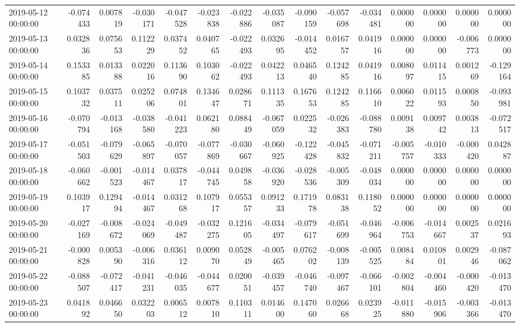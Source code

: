 \begin{tabular}{lrrrrrrrrrrrrrr}
2019-05-12 00:00:00 & -0.074433 & 0.007819 & -0.030171 & -0.047528 & -0.023838 & -0.022886 & -0.035087 & -0.090159 & -0.057698 & -0.034481 & 0.000000 & 0.000000 & 0.000000 & 0.000000 \\
2019-05-13 00:00:00 & 0.032836 & 0.075653 & 0.112229 & 0.037452 & 0.040765 & -0.022493 & 0.032695 & -0.014452 & 0.016757 & 0.041916 & 0.000000 & 0.000000 & -0.006773 & 0.000000 \\
2019-05-14 00:00:00 & 0.153385 & 0.013388 & 0.022016 & 0.113690 & 0.103062 & -0.022493 & 0.042213 & 0.046540 & 0.124285 & 0.041916 & 0.008097 & 0.011415 & 0.001269 & -0.129164 \\
2019-05-15 00:00:00 & 0.103732 & 0.037511 & 0.025206 & 0.074801 & 0.134647 & 0.028671 & 0.111335 & 0.167653 & 0.124285 & 0.116610 & 0.006022 & 0.011593 & 0.000850 & -0.093981 \\
2019-05-16 00:00:00 & -0.070794 & -0.013168 & -0.038580 & -0.041223 & 0.062180 & 0.088449 & -0.067059 & 0.022532 & -0.026383 & -0.088780 & 0.009138 & 0.009742 & 0.003813 & -0.072517 \\
2019-05-17 00:00:00 & -0.051503 & -0.079629 & -0.065897 & -0.070057 & -0.077869 & -0.030667 & -0.060925 & -0.122428 & -0.045832 & -0.071211 & -0.005757 & -0.010333 & -0.000420 & 0.042887 \\
2019-05-18 00:00:00 & -0.060662 & -0.001523 & -0.014467 & 0.037817 & -0.044745 & 0.049858 & -0.036920 & -0.028536 & -0.005309 & -0.048034 & 0.000000 & 0.000000 & 0.000000 & 0.000000 \\
2019-05-19 00:00:00 & 0.103917 & 0.129494 & -0.014467 & 0.031268 & 0.107917 & 0.055357 & 0.091233 & 0.171978 & 0.083138 & 0.118052 & 0.000000 & 0.000000 & 0.000000 & 0.000000 \\
2019-05-20 00:00:00 & -0.027169 & -0.008672 & -0.024069 & -0.049487 & -0.032275 & 0.121605 & -0.034497 & -0.079617 & -0.051699 & -0.046964 & -0.006753 & -0.014667 & 0.002537 & 0.021693 \\
2019-05-21 00:00:00 & -0.000828 & 0.005390 & -0.006316 & 0.036112 & 0.009070 & 0.052849 & -0.005465 & 0.076202 & -0.008139 & -0.005525 & 0.008484 & 0.010801 & 0.002946 & -0.087062 \\
2019-05-22 00:00:00 & -0.088507 & -0.072417 & -0.041231 & -0.046035 & -0.044677 & 0.020051 & -0.039457 & -0.046740 & -0.097467 & -0.066101 & -0.002804 & -0.004460 & -0.000420 & -0.013470 \\
2019-05-23 00:00:00 & 0.041892 & 0.046650 & 0.032203 & 0.006512 & 0.007810 & 0.110311 & 0.014600 & 0.147060 & 0.026668 & 0.023925 & -0.011880 & -0.015906 & -0.003366 & -0.013470 \\

\end{tabular}
